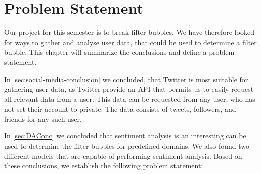 \chapter{Problem Statement}\label{ch:problem}

Our project for this semester is to break filter bubbles. We have therefore
looked for ways to gather and analyse user data, that could be used to
determine a filter bubble. This chapter will summarize the conclusions and
define a problem statement.\nl

In \autoref{sec:social-media-conclusion} we concluded, that Twitter is most suitable
for gathering user data, as Twitter provide an \ac{API} that permits us to
easily request all relevant data from a user. This data can be requested from
any user, who has not set their account to private. The data consists of tweets,
followers, and friends for any such user.\nl

In \autoref{sec:DAConc} we concluded that sentiment analysis is an interesting
can be used to determine the filter bubbles for predefined domains. We also
found two different models that are capable of performing sentiment
analysis. Based on these conclusions, we establish the following problem
statement:


\begin{center}
\begin{minipage}{0.95\linewidth} 


\end{minipage}
\end{center}




